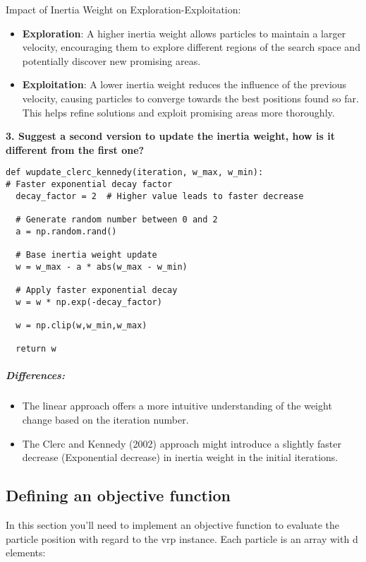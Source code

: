 \documentclass[letterpaper, 12pt]{article}
\begin{document}
Impact of Inertia Weight on Exploration-Exploitation:
\begin{itemize}
    \item \textbf{Exploration}: A higher inertia weight allows particles to maintain a larger velocity, encouraging them to explore different regions of the search space and potentially discover new promising areas.
    \item \textbf{Exploitation}: A lower inertia weight reduces the influence of the previous velocity, causing particles to converge towards the best positions found so far. This helps refine solutions and exploit promising areas more thoroughly.
\end{itemize}

\textbf{3. Suggest a second version to update the inertia weight, how is it different from the first one?} \\
\begin{lstlisting}
def wupdate_clerc_kennedy(iteration, w_max, w_min):
# Faster exponential decay factor 
  decay_factor = 2  # Higher value leads to faster decrease

  # Generate random number between 0 and 2
  a = np.random.rand()

  # Base inertia weight update
  w = w_max - a * abs(w_max - w_min)

  # Apply faster exponential decay
  w = w * np.exp(-decay_factor)

  w = np.clip(w,w_min,w_max)

  return w

\end{lstlisting}

\subparagraph{Differences:}

\begin{itemize}
    \item The linear approach offers a more intuitive understanding of the weight change based on the iteration number.
    \item The Clerc and Kennedy (2002) approach might introduce a slightly faster decrease (Exponential decrease) in inertia weight in the initial iterations.
\end{itemize}


\subsection*{Defining an objective function}
In this section you'll need to implement an objective function to evaluate the particle position with regard to the vrp instance. Each particle is an array with d elements:
\end{document}
